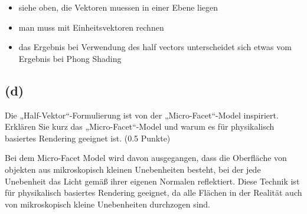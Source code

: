 \documentclass[12pt]{scrreprt}
\begin{document}
\begin{itemize}
  \item siehe oben, die Vektoren muessen in einer Ebene liegen
  \item man muss mit Einheitsvektoren rechnen
  \item das Ergebnis bei Verwendung des half vectors unterscheidet
    sich etwas vom Ergebnis bei Phong Shading
\end{itemize}


\subsection*{(d)}
Die „Half-Vektor“-Formulierung ist von der „Micro-Facet“-Model inspiriert. Erklären Sie kurz
das „Micro-Facet“-Model und warum es für physikalisch basiertes Rendering geeignet ist. (0.5
Punkte)

Bei dem Micro-Facet Model wird davon ausgegangen, dass die Oberfläche von objekten aus mikroskopisch kleinen Unebenheiten besteht, bei der jede Unebenheit das Licht gemäß ihrer eigenen Normalen reflektiert. Diese Technik ist für physikalisch basiertes Rendering geeignet, da alle Flächen in der Realität auch von mikroskopisch kleine Unebenheiten durchzogen sind.
\end{document}
